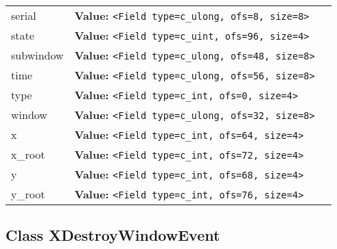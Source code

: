 \begin{longtable}{|p{\varnamewidth}|p{\vardescrwidth}|l}
\cline{1-2}
\raggedright s\-e\-r\-i\-a\-l\- & \raggedright \textbf{Value:} 
{\tt {\textless}Field type=c\_ulong, ofs=8, size=8{\textgreater}}&\\
\cline{1-2}
\raggedright s\-t\-a\-t\-e\- & \raggedright \textbf{Value:} 
{\tt {\textless}Field type=c\_uint, ofs=96, size=4{\textgreater}}&\\
\cline{1-2}
\raggedright s\-u\-b\-w\-i\-n\-d\-o\-w\- & \raggedright \textbf{Value:} 
{\tt {\textless}Field type=c\_ulong, ofs=48, size=8{\textgreater}}&\\
\cline{1-2}
\raggedright t\-i\-m\-e\- & \raggedright \textbf{Value:} 
{\tt {\textless}Field type=c\_ulong, ofs=56, size=8{\textgreater}}&\\
\cline{1-2}
\raggedright t\-y\-p\-e\- & \raggedright \textbf{Value:} 
{\tt {\textless}Field type=c\_int, ofs=0, size=4{\textgreater}}&\\
\cline{1-2}
\raggedright w\-i\-n\-d\-o\-w\- & \raggedright \textbf{Value:} 
{\tt {\textless}Field type=c\_ulong, ofs=32, size=8{\textgreater}}&\\
\cline{1-2}
\raggedright x\- & \raggedright \textbf{Value:} 
{\tt {\textless}Field type=c\_int, ofs=64, size=4{\textgreater}}&\\
\cline{1-2}
\raggedright x\-\_\-r\-o\-o\-t\- & \raggedright \textbf{Value:} 
{\tt {\textless}Field type=c\_int, ofs=72, size=4{\textgreater}}&\\
\cline{1-2}
\raggedright y\- & \raggedright \textbf{Value:} 
{\tt {\textless}Field type=c\_int, ofs=68, size=4{\textgreater}}&\\
\cline{1-2}
\raggedright y\-\_\-r\-o\-o\-t\- & \raggedright \textbf{Value:} 
{\tt {\textless}Field type=c\_int, ofs=76, size=4{\textgreater}}&\\
\cline{1-2}
\end{longtable}



\subsection{Class XDestroyWindowEvent}

